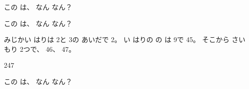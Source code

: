 \begin{jibun}
\noindent\begin{minipage}[c]{0.7\linewidth}
この \mbox{}は、 なん なん？\par\vspace{4pt}
\noindent\bkqijifun
\end{minipage}\hfill
\begin{minipage}[c]{0.28\linewidth}\centering
{}
\end{minipage}
\end{jibun}

\begin{reidai}[1\R{分}{ぷん}まで よむ]
\noindent\begin{minipage}[c]{0.7\linewidth}
この \mbox{}は、 なん なん？

\kangaekata みじかい はりは 2と 3の あいだで 2。 い はりの の は 9で \mbox{45}。 そこから さい もり 2つで、 46、 47。

\kotae \mbox{247}
\end{minipage}\hfill
\begin{minipage}[c]{0.28\linewidth}\centering
{}
\end{minipage}
\end{reidai}

\begin{jibun}
\noindent\begin{minipage}[c]{0.7\linewidth}
この \mbox{}は、 なん なん？\par\vspace{4pt}
\noindent\bkqijifun
\end{minipage}\hfill
\begin{minipage}[c]{0.28\linewidth}\centering
{}
\end{minipage}
\end{jibun}

